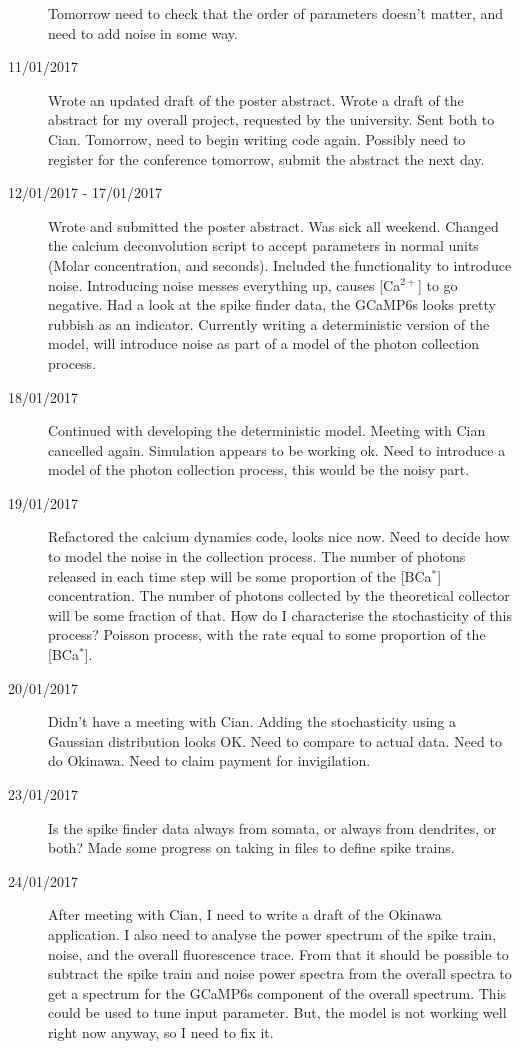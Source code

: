 \documentclass[a4paper,12pt]{article}
\theoremstyle{definition}
\begin{document}
\begin{description}
	Tomorrow need to check that the order of parameters doesn't matter, and need to add noise in some way.

	\item[11/01/2017] Wrote an updated draft of the poster abstract. Wrote a draft of the abstract for my overall project, requested by the university. Sent both to Cian. Tomorrow, need to begin writing code again. Possibly need to register for the conference tomorrow, submit the abstract the next day.

	\item[12/01/2017 - 17/01/2017] Wrote and submitted the poster abstract. Was sick all weekend. Changed the calcium deconvolution script to accept parameters in normal units (Molar concentration, and seconds). Included the functionality to introduce noise. Introducing noise messes everything up, causes [Ca$^{2+}$] to go negative. Had a look at the spike finder data, the GCaMP6s looks pretty rubbish as an indicator. Currently writing a deterministic version of the model, will introduce noise as part of a model of the photon collection process.

	\item[18/01/2017]Continued with developing the deterministic model. Meeting with Cian cancelled again. Simulation appears to be working ok. Need to introduce a model of the photon collection process, this would be the noisy part.

	\item[19/01/2017] Refactored the calcium dynamics code, looks nice now. Need to decide how to model the noise in the collection process. The number of photons released in each time step will be some proportion of the [BCa$^*$] concentration. The number of photons collected by the theoretical collector will be some fraction of that. How do I characterise the stochasticity of this process? Poisson process, with the rate equal to some proportion of the [BCa$^*$].

	\item[20/01/2017] Didn't have a meeting with Cian. Adding the stochasticity using a Gaussian distribution looks OK. Need to compare to actual data. Need to do Okinawa. Need to claim payment for invigilation.

	\item[23/01/2017] Is the spike finder data always from somata, or always from dendrites, or both? Made some progress on taking in files to define spike trains.

	\item[24/01/2017] After meeting with Cian, I need to write a draft of the Okinawa application. I also need to analyse the power spectrum of the spike train, noise, and the overall fluorescence trace. From that it should be possible to subtract the spike train and noise power spectra from the overall spectra to get a spectrum for the GCaMP6s component of the overall spectrum. This could be used to tune input parameter. But, the model is not working well right now anyway, so I need to fix it.


\end{description}
\end{document}
